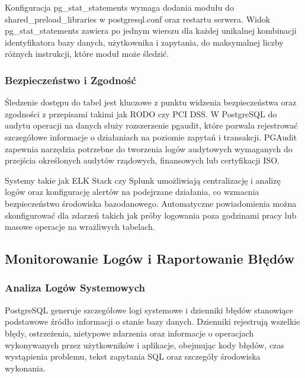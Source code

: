 \documentclass[letterpaper,10pt,polish]{sphinxmanual}
\begin{document}
\sphinxAtStartPar
Konfiguracja pg\_stat\_statements wymaga dodania modułu do shared\_preload\_libraries w postgresql.conf oraz restartu serwera. Widok pg\_stat\_statements zawiera po jednym wierszu dla każdej unikalnej kombinacji identyfikatora bazy danych, użytkownika i zapytania, do maksymalnej liczby różnych instrukcji, które moduł może śledzić.


\subsubsection{Bezpieczeństwo i Zgodność}
\label{\detokenize{rozdzial2/repo-wspolne/index:bezpieczenstwo-i-zgodnosc}}
\sphinxAtStartPar
Śledzenie dostępu do tabel jest kluczowe z punktu widzenia bezpieczeństwa oraz zgodności z przepisami takimi jak RODO czy PCI DSS. W PostgreSQL do audytu operacji na danych służy rozszerzenie pgaudit, które pozwala rejestrować szczegółowe informacje o działaniach na poziomie zapytań i transakcji. PGAudit zapewnia narzędzia potrzebne do tworzenia logów audytowych wymaganych do przejścia określonych audytów rządowych, finansowych lub certyfikacji ISO.

\sphinxAtStartPar
Systemy takie jak ELK Stack czy Splunk umożliwiają centralizację i analizę logów oraz konfigurację alertów na podejrzane działania, co wzmacnia bezpieczeństwo środowiska bazodanowego. Automatyczne powiadomienia można skonfigurować dla zdarzeń takich jak próby logowania poza godzinami pracy lub masowe operacje na wrażliwych tabelach.


\subsection{Monitorowanie Logów i Raportowanie Błędów}
\label{\detokenize{rozdzial2/repo-wspolne/index:monitorowanie-logow-i-raportowanie-bledow}}

\subsubsection{Analiza Logów Systemowych}
\label{\detokenize{rozdzial2/repo-wspolne/index:analiza-logow-systemowych}}
\sphinxAtStartPar
PostgreSQL generuje szczegółowe logi systemowe i dzienniki błędów stanowiące podstawowe źródło informacji o stanie bazy danych. Dzienniki rejestrują wszelkie błędy, ostrzeżenia, nietypowe zdarzenia oraz informacje o operacjach wykonywanych przez użytkowników i aplikacje, obejmując kody błędów, czas wystąpienia problemu, tekst zapytania SQL oraz szczegóły środowiska wykonania.
\end{document}
